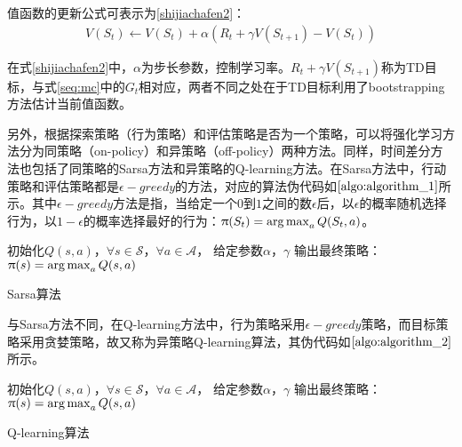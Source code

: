 值函数的更新公式可表示为\eqref{shijiachafen2}：
\begin{equation}\label{shijiachafen2}
\begin{aligned}
V(S_{t}) \gets V(S_{t})+\alpha (R_{t}+\gamma V(S_{t+1})-V(S_{t}))
\end{aligned}
\end{equation}

在式\eqref{shijiachafen2}中，$\alpha$为步长参数，控制学习率。$R_{t}+\gamma V(S_{t+1})$称为TD目标，与式\eqref{seq:mc}中的$G_{t}$相对应，两者不同之处在于TD目标利用了bootstrapping方法估计当前值函数。

另外，根据探索策略（行为策略）和评估策略是否为一个策略，可以将强化学习方法分为同策略（on-policy）和异策略（off-policy）两种方法。同样，时间差分方法也包括了同策略的Sarsa方法和异策略的Q-learning方法。在Sarsa方法中，行动策略和评估策略都是$\epsilon-greedy$的方法，对应的算法伪代码如$\ref{algo:algorithm_1}$所示。其中$\epsilon-greedy$方法是指，当给定一个$0$到$1$之间的数$\epsilon$后，以$\epsilon$的概率随机选择行为，以$1-\epsilon$的概率选择最好的行为：$\uppi(S_{t})=\operatorname*{arg\,max}_{a} Q(S_{t},a)$。

\begin{algorithm}[htbp]
\small
\SetAlgoLined
{} 
初始化$Q(s,a)$，$\forall s \in \mathcal{S}$，$\forall a \in \mathcal{A}$， 给定参数$\alpha$，$\gamma$\;
输出最终策略：$\uppi(s)=\operatorname*{arg\,max}_{a}Q(s,a)$\;
\caption{Sarsa算法}
\label{algo:algorithm_1}
\end{algorithm}

与Sarsa方法不同，在Q-learning方法中，行为策略采用$\epsilon-greedy$策略，而目标策略采用贪婪策略，故又称为异策略Q-learning算法，其伪代码如$\ref{algo:algorithm_2}$所示。
\begin{algorithm}[htbp]
\small
\SetAlgoLined
{} 
初始化$Q(s,a)$，$\forall s \in \mathcal{S}$，$\forall a \in \mathcal{A}$， 给定参数$\alpha$，$\gamma$\;
输出最终策略：$\uppi(s)=\operatorname*{arg\,max}_{a}Q(s,a)$\;
\caption{Q-learning算法}
\label{algo:algorithm_2}
\end{algorithm}

